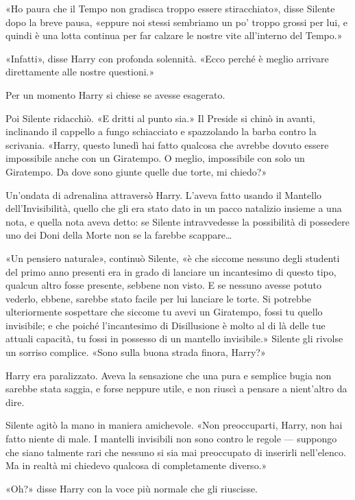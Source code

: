 «Ho paura che il Tempo non gradisca troppo essere stiracchiato», disse Silente dopo la breve pausa, «eppure noi stessi sembriamo un po’ troppo grossi per lui, e quindi è una lotta continua per far calzare le nostre vite all’interno del Tempo.»

«Infatti», disse Harry con profonda solennità. «Ecco perché è meglio arrivare direttamente alle nostre questioni.»

Per un momento Harry si chiese se avesse esagerato.

Poi Silente ridacchiò. «E dritti al punto sia.» Il Preside si chinò in avanti, inclinando il cappello a fungo schiacciato e spazzolando la barba contro la scrivania. «Harry, questo lunedì hai fatto qualcosa che avrebbe dovuto essere impossibile anche con un Giratempo. O meglio, impossibile con solo un Giratempo. Da dove sono giunte quelle due torte, mi chiedo?»

Un’ondata di adrenalina attraversò Harry. L’aveva fatto usando il Mantello dell’Invisibilità, quello che gli era stato dato in un pacco natalizio insieme a una nota, e quella nota aveva detto: se Silente intravvedesse la possibilità di possedere uno dei Doni della Morte non se la farebbe scappare…

«Un pensiero naturale», continuò Silente, «è che siccome nessuno degli studenti del primo anno presenti era in grado di lanciare un incantesimo di questo tipo, qualcun altro fosse presente, sebbene non visto. E se nessuno avesse potuto vederlo, ebbene, sarebbe stato facile per lui lanciare le torte. Si potrebbe ulteriormente sospettare che siccome tu avevi un Giratempo, fossi tu quello invisibile; e che poiché l’incantesimo di Disillusione è molto al di là delle tue attuali capacità, tu fossi in possesso di un mantello invisibile.» Silente gli rivolse un sorriso complice. «Sono sulla buona strada finora, Harry?»

Harry era paralizzato. Aveva la sensazione che una pura e semplice bugia non sarebbe stata saggia, e forse neppure utile, e non riuscì a pensare a nient’altro da dire.

Silente agitò la mano in maniera amichevole. «Non preoccuparti, Harry, non hai fatto niente di male. I mantelli invisibili non sono contro le regole — suppongo che siano talmente rari che nessuno si sia mai preoccupato di inserirli nell’elenco. Ma in realtà mi chiedevo qualcosa di completamente diverso.»

«Oh?» disse Harry con la voce più normale che gli riuscisse.


